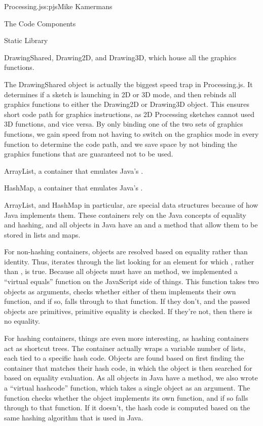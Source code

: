 \begin{aosachapter}{Processing.js}{s:pjs}{Mike Kamermans}
\begin{aosasect1}{The Code Components}
\begin{aosasect2}{Static Library}
\begin{aosaitemize}
\item DrawingShared, Drawing2D, and Drawing3D, which house all the
  graphics functions.

The DrawingShared object is actually the biggest speed trap in
Processing.js. It determines if a sketch is
launching in 2D or 3D mode, and then rebinds all graphics functions
to either the Drawing2D or Drawing3D object. This ensures short code
path for graphics instructions, as 2D Processing sketches cannot used
3D functions, and vice versa. By only binding one of the two sets of
graphics functions, we gain speed from not having to switch on the
graphics mode in every function to determine the code path, and we
save space by not binding the graphics functions that are guaranteed
not to be used.

\item ArrayList, a container that emulates Java's .

\item HashMap, a container that emulates Java's .

ArrayList, and HashMap in particular, are special data structures
because of how Java implements them. These containers rely on the Java
concepts of equality and hashing, and all objects in Java have an
 and a  method that allow them to be
stored in lists and maps.

For non-hashing containers, objects are resolved based on equality
rather than identity. Thus,  iterates through the
list looking for an element for which , rather
than , is true. Because all objects must have an
 method, we implemented a ``virtual equals'' function on
the JavaScript side of things. This function takes two objects as
arguments, checks whether either of them implements their own
 function, and if so, falls through to that function.
If they don't, and the passed objects are primitives,
primitive equality is checked. If they're not, then there is no
equality.

For hashing containers, things are even more interesting, as hashing
containers act as shortcut trees. The container actually wraps a
variable number of lists, each tied to a specific hash code. Objects
are found based on first finding the container that matches their hash
code, in which the object is then searched for based on equality
evaluation. As all objects in Java have a  method, we also
wrote a ``virtual hashcode'' function, which takes a single object as
an argument. The function checks whether the object implements its own
 function, and if so falls through to that function.
If it doesn't, the hash code is computed based on the same
hashing algorithm that is used in Java.


\end{aosaitemize}
\end{aosasect2}
\end{aosasect1}
\end{aosachapter}
